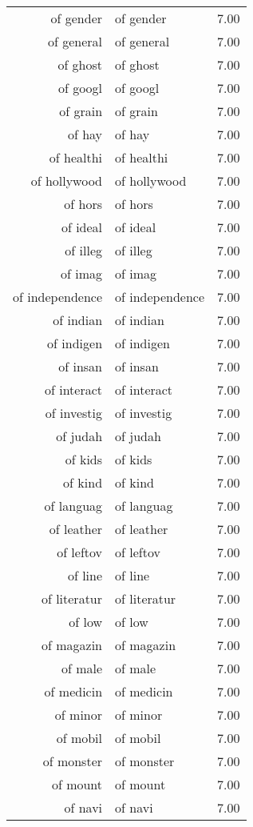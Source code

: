 \begin{table}[ht]
\begin{tabular}{rlr}
  of gender & of gender & 7.00 \\ 
  of general & of general & 7.00 \\ 
  of ghost & of ghost & 7.00 \\ 
  of googl & of googl & 7.00 \\ 
  of grain & of grain & 7.00 \\ 
  of hay & of hay & 7.00 \\ 
  of healthi & of healthi & 7.00 \\ 
  of hollywood & of hollywood & 7.00 \\ 
  of hors & of hors & 7.00 \\ 
  of ideal & of ideal & 7.00 \\ 
  of illeg & of illeg & 7.00 \\ 
  of imag & of imag & 7.00 \\ 
  of independence & of independence & 7.00 \\ 
  of indian & of indian & 7.00 \\ 
  of indigen & of indigen & 7.00 \\ 
  of insan & of insan & 7.00 \\ 
  of interact & of interact & 7.00 \\ 
  of investig & of investig & 7.00 \\ 
  of judah & of judah & 7.00 \\ 
  of kids & of kids & 7.00 \\ 
  of kind & of kind & 7.00 \\ 
  of languag & of languag & 7.00 \\ 
  of leather & of leather & 7.00 \\ 
  of leftov & of leftov & 7.00 \\ 
  of line & of line & 7.00 \\ 
  of literatur & of literatur & 7.00 \\ 
  of low & of low & 7.00 \\ 
  of magazin & of magazin & 7.00 \\ 
  of male & of male & 7.00 \\ 
  of medicin & of medicin & 7.00 \\ 
  of minor & of minor & 7.00 \\ 
  of mobil & of mobil & 7.00 \\ 
  of monster & of monster & 7.00 \\ 
  of mount & of mount & 7.00 \\ 
  of navi & of navi & 7.00 \\ 

\end{tabular}
\end{table}
